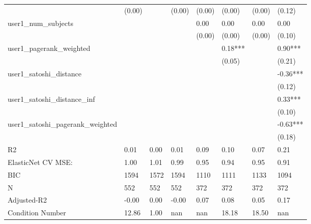 \begin{table}
\begin{center}
\begin{tabular}{llllllll}
                                                 & (0.00)   &            & (0.00)  & (0.00)  & (0.00)   & (0.00)             & (0.12)    \\
user1_num_subjects                               &          &            &         & 0.00    & 0.00     & 0.00               & 0.00      \\
                                                 &          &            &         & (0.00)  & (0.00)   & (0.00)             & (0.10)    \\
user1_pagerank_weighted                          &          &            &         &         & 0.18***  &                    & 0.90***   \\
                                                 &          &            &         &         & (0.05)   &                    & (0.21)    \\
user1_satoshi_distance                           &          &            &         &         &          &                    & -0.36***  \\
                                                 &          &            &         &         &          &                    & (0.12)    \\
user1_satoshi_distance_inf                       &          &            &         &         &          &                    & 0.33***   \\
                                                 &          &            &         &         &          &                    & (0.10)    \\
user1_satoshi_pagerank_weighted                  &          &            &         &         &          &                    & -0.63***  \\
                                                 &          &            &         &         &          &                    & (0.18)    \\
R2                                               & 0.01     & 0.00       & 0.01    & 0.09    & 0.10     & 0.07               & 0.21      \\
ElasticNet CV MSE:                               & 1.00     & 1.01       & 0.99    & 0.95    & 0.94     & 0.95               & 0.91      \\
BIC                                              & 1594     & 1572       & 1594    & 1110    & 1111     & 1133               & 1094      \\
N                                                & 552      & 552        & 552     & 372     & 372      & 372                & 372       \\
Adjusted-R2                                      & -0.00    & 0.00       & -0.00   & 0.07    & 0.08     & 0.05               & 0.17      \\
Condition Number                                 & 12.86    & 1.00       & nan     & nan     & 18.18    & 18.50              & nan       \\
\hline
\end{tabular}
\end{center}
\end{table}